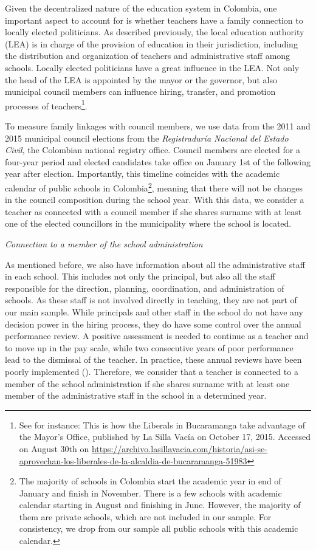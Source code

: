 \documentclass[12pt,runningheads]{article}
\begin{document}
Given the decentralized nature of the education system in Colombia, one important aspect to account for is whether teachers have a family connection to locally elected politicians. As described previously, the local education authority (LEA) is in charge of the provision of education in their jurisdiction, including the distribution and organization of teachers and administrative staff among schools. Locally elected politicians have a great influence in the LEA. Not only the head of the LEA is appointed by the mayor or the governor, but also municipal council members can influence hiring, transfer, and promotion processes of teachers\footnote{See for instance: This is how the Liberals in
Bucaramanga take advantage of the Mayor’s Office, published by La Silla Vacía on October 17, 2015. Accessed on August 30th on \url{ https://archivo.lasillavacia.com/historia/asi-se-aprovechan-los-liberales-de-la-alcaldia-de-bucaramanga-51983}}.

To measure family linkages with council members, we use data from the 2011 and 2015 municipal council elections from the \textit{Registraduría Nacional del Estado Civil}, the Colombian national registry office. Council members are elected for a four-year period and elected candidates take office on January 1st of the following year after election. Importantly, this timeline coincides with the academic calendar of public schools in Colombia\footnote{The majority of schools in Colombia start the academic year in end of January and finish in November. There is a few schools with academic calendar starting in August and finishing in June. However, the majority of them are private schools, which are not included in our sample. For consistency, we drop from our sample all public schools with this academic calendar.}, meaning that there will not be changes in the council composition during the school year. With this data, we consider a teacher as connected with a council member if she shares surname with at least one of the elected councillors in the municipality where the school is located. 

\noindent \textit{Connection to a member of the school administration}

As mentioned before, we also have information about all the administrative staff in each school. This includes not only the principal, but also all the staff responsible for the direction, planning, coordination, and administration of schools. As these staff is not involved directly in teaching, they are not part of our main sample. While principals and other staff in the school do not have any decision power in the hiring process, they do have some control over the annual performance review. A positive assessment is needed to continue as a teacher and to move up in the pay scale, while two consecutive years of poor performance lead to the dismissal of the teacher. In practice, these annual reviews have been poorly implemented (). Therefore, we consider that a teacher is connected to a member of the school administration if she shares surname with at least one member of the administrative staff in the school in a determined year. 
\end{document}
